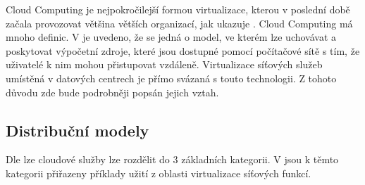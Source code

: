 Cloud Computing je nejpokročilejší formou virtualizace, kterou v poslední době začala provozovat většina větších organizací, jak ukazuje \cite{Cloud_adoption}. Cloud Computing má mnoho definic. V \cite{Cloud_book} je uvedeno, že se jedná o model, ve kterém lze uchovávat a poskytovat výpočetní zdroje, které jsou dostupné pomocí počítačové sítě s tím, že uživatelé k nim mohou přistupovat vzdáleně. Virtualizace síťových služeb umístěná v datových centrech je přímo svázaná s touto technologii. Z tohoto důvodu zde bude podrobněji popsán jejich vztah.

\subsection{Distribuční modely}

Dle \cite{CloudSurvey} lze cloudové služby lze rozdělit do 3 základních kategorii. V \cite{NFV_use_cases} jsou k těmto kategorii přiřazeny příklady užití z oblasti virtualizace síťových funkcí. 

